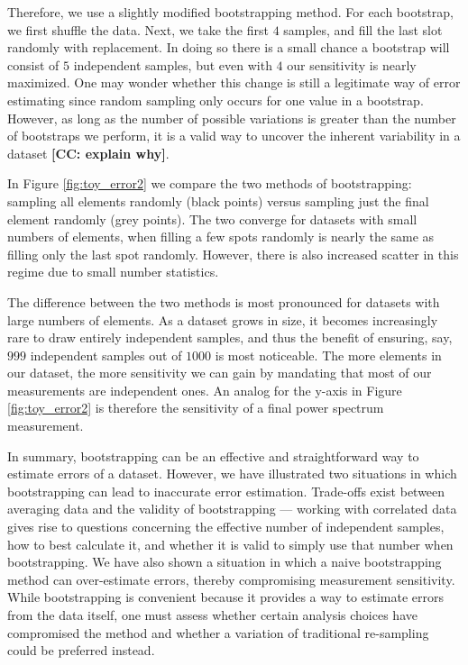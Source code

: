 \documentclass[preprint2,numberedappendix,tighten]{aastex6}  %
\newcommand{\cc}[1]{{\color{purple} \textbf{[CC: #1]}}}
\begin{document}
Therefore, we use a slightly modified bootstrapping method. For each bootstrap, we first shuffle the data. Next, we take the first $4$ samples, and fill the last slot randomly with replacement. In doing so there is a small chance a bootstrap will consist of $5$ independent samples, but even with $4$ our sensitivity is nearly maximized. One may wonder whether this change is still a legitimate way of error estimating since random sampling only occurs for one value in a bootstrap. However, as long as the number of possible variations is greater than the number of bootstraps we perform, it is a valid way to uncover the inherent variability in a dataset \cc{explain why}. 

In Figure \ref{fig:toy_error2} we compare the two methods of bootstrapping: sampling all elements randomly (black points) versus sampling just the final element randomly (grey points). The two converge for datasets with small numbers of elements, when filling a few spots randomly is nearly the same as filling only the last spot randomly. However, there is also increased scatter in this regime due to small number statistics. 

The difference between the two methods is most pronounced for datasets with large numbers of elements. As a dataset grows in size, it becomes increasingly rare to draw entirely independent samples, and thus the benefit of ensuring, say, $999$ independent samples out of $1000$ is most noticeable. The more elements in our dataset, the more sensitivity we can gain by mandating that most of our measurements are independent ones. An analog for the y-axis in Figure \ref{fig:toy_error2} is therefore the sensitivity of a final power spectrum measurement.

In summary, bootstrapping can be an effective and straightforward way to estimate errors of a dataset. However, we have illustrated two situations in which bootstrapping can lead to inaccurate error estimation. Trade-offs exist between averaging data and the validity of bootstrapping --- working with correlated data gives rise to questions concerning the effective number of independent samples, how to best calculate it, and whether it is valid to simply use that number when bootstrapping. We have also shown a situation in which a naive bootstrapping method can over-estimate errors, thereby compromising measurement sensitivity. While bootstrapping is convenient because it provides a way to estimate errors from the data itself, one must assess whether certain analysis choices have compromised the method and whether a variation of traditional re-sampling could be preferred instead.
\end{document}
